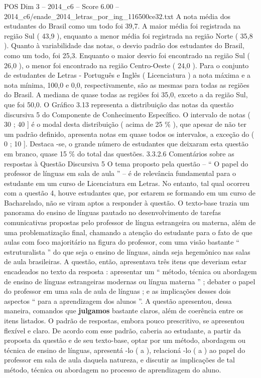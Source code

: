 \begin{textsample}{POS Dim 3 – 2014\_c6 – Score 6.00 – 2014\_c6/enade\_2014\_letras\_por\_ing\_116500ce32.txt}
A nota média dos estudantes do Brasil como um todo foi 39,7.
A maior média foi registrada na região Sul ( 43,9 ), enquanto a menor média foi registrada na região Norte ( 35,8 ).
Quanto à variabilidade das notas, o desvio padrão dos estudantes do Brasil, como um todo, foi 25,3.
Enquanto o maior desvio foi encontrado na região Sul ( 26,0 ), o menor foi encontrado na região Centro-Oeste ( 24,0 ).
Para o conjunto de estudantes de Letras - Português e Inglês ( Licenciatura ) a nota máxima e a nota mínima, 100,0 e 0,0, respectivamente, são as mesmas para todas as regiões do Brasil.
A mediana de quase todas as regiões foi 35,0, exceto a da região Sul, que foi 50,0.
O Gráfico 3.13 representa a distribuição das notas da questão discursiva 5 do Componente de Conhecimento Específico.
O intervalo de notas ( 30 ; 40 ] é o modal desta distribuição ( acima de 25 \% ), que apesar de não ter um padrão definido, apresenta notas em quase todos os intervalos, a exceção do ( 0 ; 10 ].
Destaca -se, o grande número de estudantes que deixaram esta questão em branco, quase 15 \% do total das questões. 3.3.2.6 Comentários sobre as respostas à Questão Discursiva 5 O tema proposto pela questão – “ O papel do professor de línguas em sala de aula ” – é de relevância fundamental para o estudante em um curso de Licenciatura em Letras.
No entanto, tal qual ocorreu com a questão 4, houve estudantes que, por estarem se formando em um curso de Bacharelado, não se viram aptos a responder à questão.
O texto-base trazia um panorama do ensino de línguas pautado no desenvolvimento de tarefas comunicativas propostas pelo professor de língua estrangeira ou materna, além de uma problematização final, chamando a atenção do estudante para o fato de que aulas com foco majoritário na figura do professor, com uma visão bastante “ estruturalista ” do que seja o ensino de línguas, ainda seja hegemônico nas salas de aula brasileiras.
A questão, então, apresentava três itens que deveriam estar encadeados no texto da resposta : apresentar um “ método, técnica ou abordagem de ensino de línguas estrangeiras modernas ou língua materna ” ; debater o papel do professor em uma sala de aula de línguas ; e as implicações desses dois aspectos “ para a aprendizagem dos alunos ”.
A questão apresentou, dessa maneira, comandos que \textbf{julgamos} bastante claros, além de coerência entre os itens listados.
O padrão de respostas, embora pouco prescritivo, se apresentou flexível e claro.
De acordo com esse padrão, caberia ao estudante, a partir da proposta da questão e de seu texto-base, optar por um método, abordagem ou técnica de ensino de línguas, apresentá -lo ( a ), relacioná -lo ( a ) ao papel do professor em sala de aula daquela natureza, e discutir as implicações de tal método, técnica ou abordagem no processo de aprendizagem do aluno.

\end{textsample}
